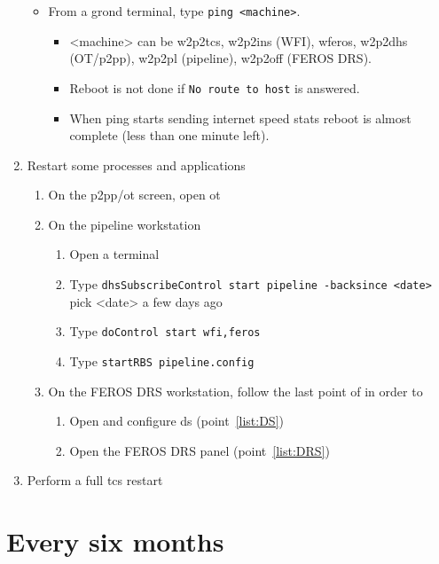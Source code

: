 \documentclass[11pt,fleqn,a4paper]{book}
\begin{document}
\begin{enumerate}
\begin{itemize}
        \item From a grond terminal, type \texttt{ping <machine>}.
             \begin{itemize}
             \item <machine> can be \gls{w2p2tcs}, \gls{w2p2ins} (WFI), \gls{wferos}, \gls{w2p2dhs} (OT/p2pp), \gls{w2p2pl} (pipeline), \gls{w2p2off} (FEROS DRS). 
             \item Reboot is not done if \texttt{No route to host} is answered.
             \item When ping starts sending internet speed stats reboot is almost complete (less than one minute left).
             \end{itemize}
    \end{itemize}
\item Restart some processes and applications
    \begin{enumerate}
        \item On the \gls{p2pp}/\gls{ot} screen, open \gls{ot}
        \item On the pipeline workstation
             \begin{enumerate}
                \item Open  a terminal
                \item Type \texttt{dhsSubscribeControl start pipeline -backsince <date>}\\
            pick <date> a few days ago
                \item Type \texttt{doControl start wfi,feros}
                \item Type \texttt{startRBS pipeline.config}
             \end{enumerate}
        \item On the FEROS DRS workstation, follow the last point of  in order to
             \begin{enumerate}
                \item Open and configure \gls{ds} (point~\ref{list:DS})
                \item Open the FEROS DRS panel (point~\ref{list:DRS})
             \end{enumerate}
    \end{enumerate}
\item \label{list:soft:tcs}Perform a full \gls{tcs} restart
\end{enumerate}

\section{Every six months}
\end{document}
